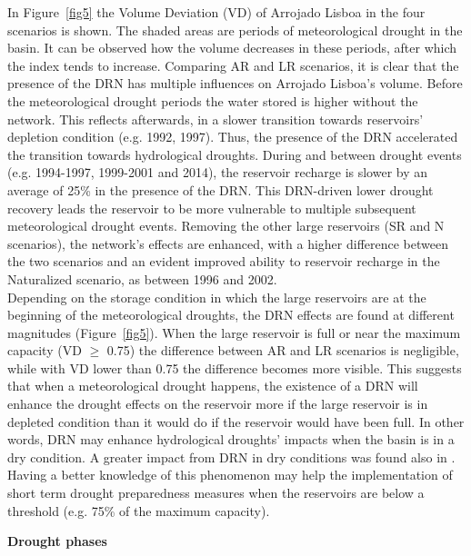 \documentclass[draft]{agujournal2019}
\begin{document}
In Figure~\ref{fig5} the Volume Deviation (VD) of Arrojado Lisboa in the four scenarios is shown. The shaded areas are periods of meteorological drought in the basin. It can be observed how the volume decreases in these periods, after which the index tends to increase. Comparing AR and LR scenarios, it is clear that the presence of the DRN has multiple influences on Arrojado Lisboa’s volume. Before the meteorological drought periods the water stored is higher without the network. This reflects afterwards, in a slower transition towards reservoirs’ depletion condition (e.g. 1992, 1997). Thus, the presence of the DRN accelerated the transition towards hydrological droughts. During and between drought events (e.g. 1994-1997, 1999-2001 and 2014), the reservoir recharge is slower by an average of 25\% in the presence of the DRN. This DRN-driven lower drought recovery leads the reservoir to be more vulnerable to multiple subsequent meteorological drought events. Removing the other large reservoirs (SR and N scenarios), the network’s effects are enhanced, with a higher difference between the two scenarios and an evident improved ability to reservoir recharge in the Naturalized scenario, as between 1996 and 2002.\\
Depending on the storage condition in which the large reservoirs are at the beginning of the meteorological droughts, the DRN effects are found at different magnitudes (Figure~\ref{fig5}). When the large reservoir is full or near the maximum capacity (VD $\geq$ 0.75) the difference between AR and LR scenarios is negligible, while with VD lower than 0.75 the difference becomes more visible. This suggests that when a meteorological drought happens, the existence of a DRN will enhance the drought effects on the reservoir more if the large reservoir is in depleted condition than it would do if the reservoir would have been full. In other words, DRN may enhance hydrological droughts' impacts when the basin is in a dry condition. A greater impact from DRN in dry conditions was found also in . Having a better knowledge of this phenomenon may help the implementation of short term drought preparedness measures when the reservoirs are below a threshold (e.g. 75\% of the maximum capacity).

\textbf{Drought phases}
\end{document}
